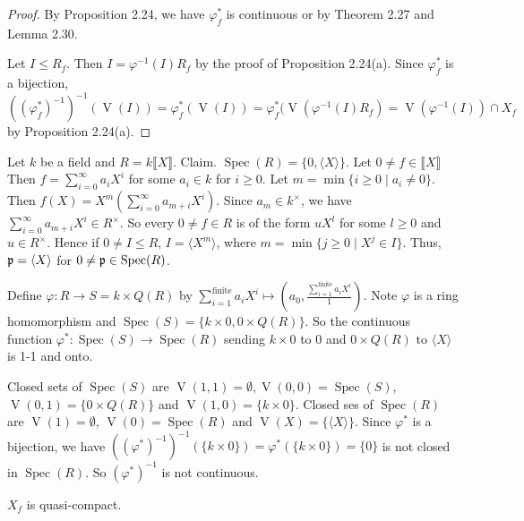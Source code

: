 \begin{proof}
    By Proposition 2.24, we have $\varphi_f^*$ is continuous or by Theorem 2.27 and Lemma 2.30. \par 
    Let $I \leq R_f$. Then $I = \varphi^{-1}(I)R_f$ by the proof of Proposition 2.24(a). Since $\varphi_f^*$ is a bijection, $((\varphi_f^*)^{-1})^{-1}(\operatorname{V}(I)) = \varphi_f^*(\operatorname{V}(I)) = \varphi_f^*(\operatorname{V}(\varphi^{-1}(I)R_f) = \operatorname{V}(\varphi^{-1}(I)) \cap X_f$ by Proposition 2.24(a). 
\end{proof}

\begin{example*}
    Let $k$ be a field and $R = k\llbracket X \rrbracket$. Claim. $\operatorname{Spec}(R) = \{0,\langle X \rangle\}$. Let $0 \neq f \in \llbracket X \rrbracket$ Then $f = \sum_{i=0}^\infty a_iX^i$ for some $a_i \in k$ for $i \geq 0$. Let $m = \min \{i \geq 0 \mid a_i \neq 0\}$. Then $f(X) = X^m(\sum_{i=0}^{\infty}a_{m+i}X^{i})$. Since $a_m \in k^\times$, we have $\sum_{i=0}^{\infty}a_{m+i}X^{i} \in R^\times$. So every $0 \neq f \in R$ is of the form $uX^l$ for some $l \geq 0$ and $u \in R^\times$. Hence if $0 \neq I \leq R$, $I = \langle X^m \rangle$, where $m = \min\{j \geq 0 \mid X^j \in I\}$. Thus, $\mathfrak{p} = \langle X \rangle$ for $0 \neq \mathfrak{p} \in \operatorname{Spec}(R)$. \par 
    Define $\varphi: R \to S = k \times Q(R)$ by $\sum_{i=1}^{\text{finite}} a_iX^i \mapsto (a_0,\frac{\sum_{i=1}^{\text{finite}} a_iX^i}{1})$. Note $\varphi$ is a ring homomorphism and $\operatorname{Spec}(S) = \{k \times 0, 0 \times Q(R)\}$. So the continuous function $\varphi^*: \operatorname{Spec}(S) \to \operatorname{Spec}(R)$ sending $k \times 0$ to $0$ and $0 \times Q(R)$ to $\langle X \rangle$ is 1-1 and onto. \par 
    Closed sets of $\operatorname{Spec}(S)$ are $\operatorname{V}(1,1) = \emptyset, \operatorname{V}(0,0) = \operatorname{Spec}(S)$, $\operatorname{V}(0,1) = \{0 \times Q(R)\}$ and $\operatorname{V}(1,0) = \{k \times 0\}$. Closed ses of $\operatorname{Spec}(R)$ are $\operatorname{V}(1) = \emptyset$, $\operatorname{V}(0) = \operatorname{Spec}(R)$ and $\operatorname{V}(X) = \{\langle X \rangle\}$. Since $\varphi^*$ is a bijection, we have $((\varphi^*)^{-1})^{-1}(\{k \times 0\}) = \varphi^*(\{k \times 0\}) = \{0\}$ is not closed in $\operatorname{Spec}(R)$. So $(\varphi^*)^{-1}$ is not continuous. 
\end{example*}

\begin{corollary}
    $X_f$ is quasi-compact.
\end{corollary}

